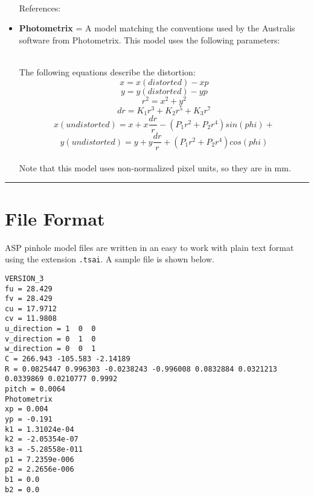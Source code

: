 \begin{itemize}{}
\hfill \\ References:

\item  \textbf{Photometrix} = A model matching the conventions used by the Australis software from Photometrix.
 This model uses the following parameters:
\hfill \\ The following equations describe the distortion:
\[ x = x(distorted) - xp \]
\[ y = y(distorted) - yp \]
\[ r^{2} = x^{2} + y^{2} \]
\[ dr = K_{1}r^{3} + K_{2}r^{5} + K_{3}r^{7} \]
\[ x(undistorted) = x + x\frac{dr}{r} - (P_{1}r^{2} +P_{2}r^{4})sin(phi) +  \]
\[ y(undistorted) = y + y\frac{dr}{r} + (P_{1}r^{2} +P_{2}r^{4})cos(phi) \]
\hfill \\ Note that this model uses non-normalized pixel units, so they
are in mm.

\end{itemize}

\hrule
\section{File Format}
\label{file_format}
\bigskip

ASP pinhole model files are written in an easy to work with plain text format 
using the extension \texttt{.tsai}.
A sample file is shown below. 

\begin{verbatim}
VERSION_3
fu = 28.429
fv = 28.429
cu = 17.9712
cv = 11.9808
u_direction = 1  0  0
v_direction = 0  1  0
w_direction = 0  0  1
C = 266.943 -105.583 -2.14189
R = 0.0825447 0.996303 -0.0238243 -0.996008 0.0832884 0.0321213 0.0339869 0.0210777 0.9992
pitch = 0.0064
Photometrix
xp = 0.004
yp = -0.191
k1 = 1.31024e-04
k2 = -2.05354e-07
k3 = -5.28558e-011
p1 = 7.2359e-006
p2 = 2.2656e-006
b1 = 0.0
b2 = 0.0
\end{verbatim}

